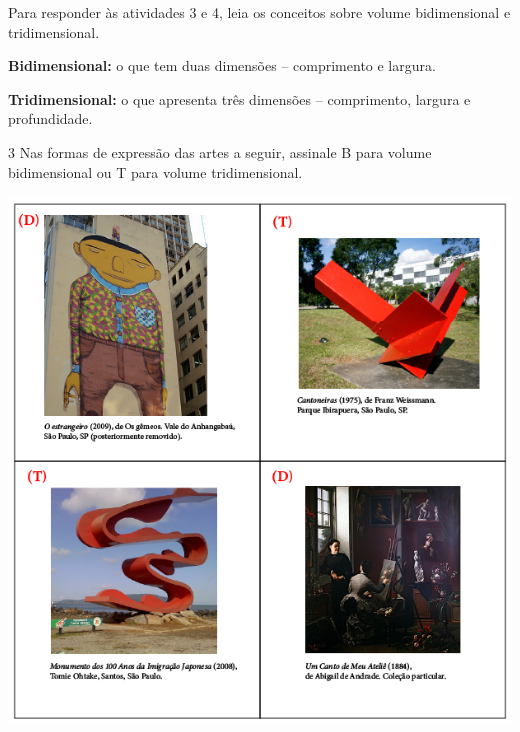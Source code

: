 \bigskip

\noindent{}Para responder às atividades 3 e 4, leia os conceitos sobre volume
bidimensional e tridimensional.

\begin{mdframed}[linewidth=2pt,linecolor=salmao,backgroundcolor=salmao!20]
\vspace{1cm}
\textbf{Bidimensional:} o que tem duas dimensões – comprimento e largura.

\vspace{1cm}

\noindent\textbf{Tridimensional:} o que apresenta três dimensões – comprimento, largura e profundidade.
\vspace{1cm}
\end{mdframed}

\num{3} Nas formas de expressão das artes a seguir, assinale B para volume bidimensional ou T para volume tridimensional.

\begin{center}
\includegraphics[width=.95\textwidth]{../ilustracoes/ART5/SAEB_5ANO_ART_FIGURA4.png}
\end{center}

\pagebreak

